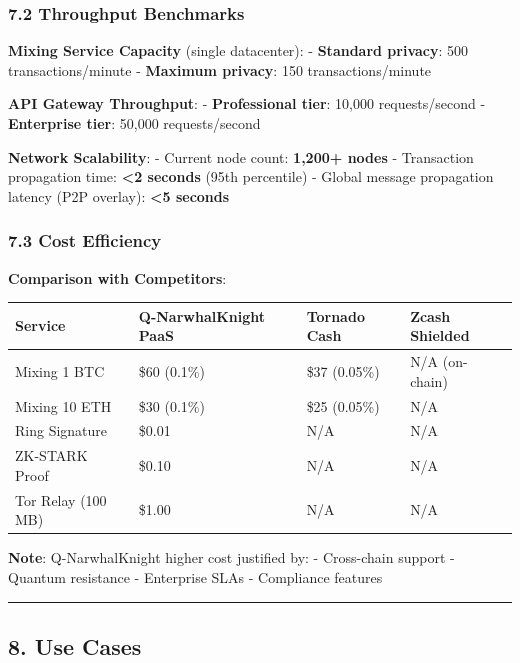 \documentclass[
  11pt,
]{article}
\begin{document}
\hypertarget{throughput-benchmarks}{%
\subsubsection{7.2 Throughput Benchmarks}\label{throughput-benchmarks}}

\textbf{Mixing Service Capacity} (single datacenter): - \textbf{Standard
privacy}: 500 transactions/minute - \textbf{Maximum privacy}: 150
transactions/minute

\textbf{API Gateway Throughput}: - \textbf{Professional tier}: 10,000
requests/second - \textbf{Enterprise tier}: 50,000 requests/second

\textbf{Network Scalability}: - Current node count: \textbf{1,200+
nodes} - Transaction propagation time: \textbf{\textless2 seconds} (95th
percentile) - Global message propagation latency (P2P overlay):
\textbf{\textless5 seconds}

\hypertarget{cost-efficiency}{%
\subsubsection{7.3 Cost Efficiency}\label{cost-efficiency}}

\textbf{Comparison with Competitors}:

\begin{longtable}[]{@{}llll@{}}
\toprule
Service & Q-NarwhalKnight PaaS & Tornado Cash & Zcash Shielded \\
\midrule
\endhead
Mixing 1 BTC & \$60 (0.1\%) & \$37 (0.05\%) & N/A (on-chain) \\
Mixing 10 ETH & \$30 (0.1\%) & \$25 (0.05\%) & N/A \\
Ring Signature & \$0.01 & N/A & N/A \\
ZK-STARK Proof & \$0.10 & N/A & N/A \\
Tor Relay (100 MB) & \$1.00 & N/A & N/A \\
\bottomrule
\end{longtable}

\textbf{Note}: Q-NarwhalKnight higher cost justified by: - Cross-chain
support - Quantum resistance - Enterprise SLAs - Compliance features

\begin{center}\rule{0.5\linewidth}{0.5pt}\end{center}

\hypertarget{use-cases}{%
\subsection{8. Use Cases}\label{use-cases}}
\end{document}
